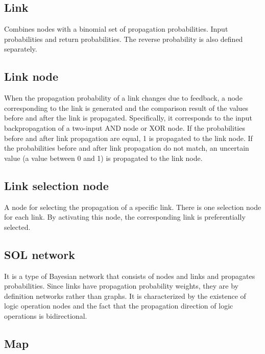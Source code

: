 \documentclass[12pt]{article}
\begin{document}
\subsection*{Link}\label{glossary-link}

Combines nodes with a binomial set of propagation probabilities. Input
probabilities and return probabilities. The reverse probability is also
defined separately.

\subsection*{Link node}\label{glossary-link-node}

When the propagation probability of a link changes due to feedback, a
node corresponding to the link is generated and the comparison result of
the values before and after the link is propagated. Specifically, it
corresponds to the input backpropagation of a two-input AND node or XOR
node. If the probabilities before and after link propagation are equal,
1 is propagated to the link node. If the probabilities before and after
link propagation do not match, an uncertain value (a value between 0 and
1) is propagated to the link node.

\subsection*{Link selection node}\label{glossary-link-selection-node}

A node for selecting the propagation of a specific link. There is one
selection node for each link. By activating this node, the corresponding
link is preferentially selected.

\subsection*{SOL network}\label{glossary-sol-network}

It is a type of Bayesian network that consists of nodes and links and
propagates probabilities. Since links have propagation probability
weights, they are by definition networks rather than graphs. It is
characterized by the existence of logic operation nodes and the fact
that the propagation direction of logic operations is bidirectional.

\subsection*{Map}\label{glossary-map}
\end{document}
